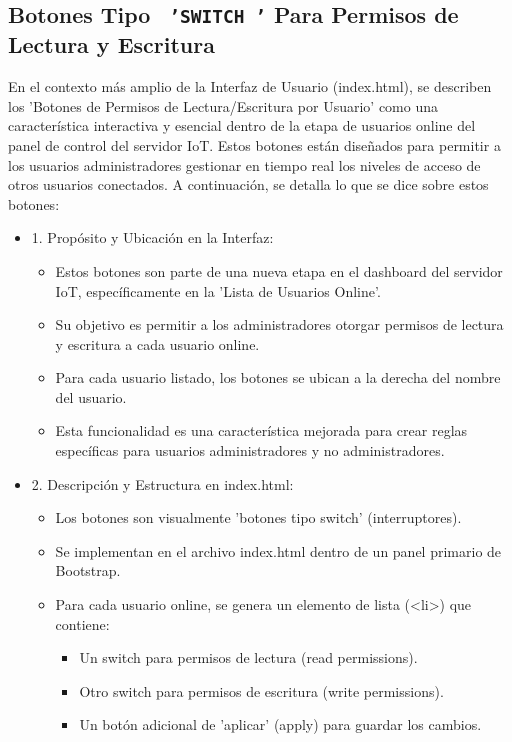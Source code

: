 \documentclass{report}
\begin{document}
\subsection{Botones Tipo \texttt{ 'SWITCH '} Para Permisos de Lectura y Escritura}
En el contexto más amplio de la Interfaz de Usuario (index.html), se  describen los 'Botones de Permisos de Lectura/Escritura 
por Usuario' como una característica interactiva y esencial dentro de la etapa de usuarios online del panel de control del servidor IoT. 
Estos botones están diseñados para permitir a los usuarios administradores gestionar en tiempo real los niveles de acceso de otros 
usuarios conectados.
A continuación, se detalla lo que se  dice sobre estos botones:
\begin{itemize}
    \item 1. Propósito y Ubicación en la Interfaz:
    \begin{itemize}
        \item Estos botones son parte de una nueva etapa en el dashboard del servidor IoT, específicamente en la 'Lista de Usuarios Online'.
        \item Su objetivo es permitir a los administradores otorgar permisos de lectura y escritura a cada usuario online.
        \item Para cada usuario listado, los botones se ubican a la derecha del nombre del usuario.
        \item Esta funcionalidad es una característica mejorada para crear reglas específicas para usuarios administradores y no administradores.
    \end{itemize}
    \item 2. Descripción y Estructura en index.html:
    \begin{itemize}
        \item Los botones son visualmente 'botones tipo switch' (interruptores).
        \item Se implementan en el archivo index.html dentro de un panel primario de Bootstrap.
        \item Para cada usuario online, se genera un elemento de lista (<li>) que contiene:
        \begin{itemize}
            \item Un switch para permisos de lectura (read permissions).
            \item Otro switch para permisos de escritura (write permissions).
            \item Un botón adicional de 'aplicar' (apply) para guardar los cambios.

\end{itemize}
\end{itemize}
\end{itemize}
\end{document}
